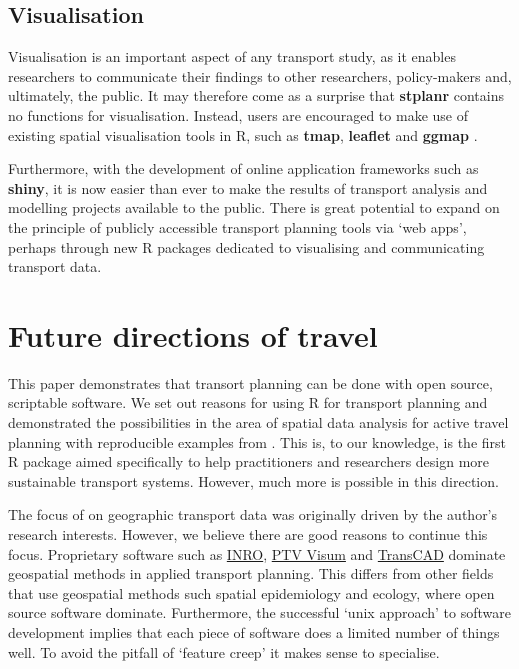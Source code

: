 \subsection{Visualisation}\label{visualisation}

Visualisation is an important aspect of any transport study, as it
enables researchers to communicate their findings to other researchers,
policy-makers and, ultimately, the public. It may therefore come as a
surprise that \textbf{stplanr} contains no functions for visualisation.
Instead, users are encouraged to make use of existing spatial
visualisation tools in R, such as \textbf{tmap}, \textbf{leaflet} and
\textbf{ggmap} \citep{cheshire_spatial_2015,kahle_ggmap:_2013}.

Furthermore, with the development of online application frameworks such
as \textbf{shiny}, it is now easier than ever to make the results of
transport analysis and modelling projects available to the public.
There is great potential to expand on
the principle of publicly accessible transport planning tools via `web
apps', perhaps through new R packages dedicated to visualising
and communicating transport data.

\section{Future directions of travel}\label{future-directions-of-travel}

This paper demonstrates that transort planning can be done with open source, scriptable software.
We set out reasons for using R for transport planning and demonstrated the possibilities in the area of spatial data analysis for active travel planning with reproducible examples from .
This is, to our knowledge, is the first R package aimed specifically to help practitioners and researchers design more sustainable transport systems.
However, much more is possible in this direction.

The focus of  on geographic transport data was originally driven by the author's research interests.
However, we believe there are good reasons to continue this focus.
Proprietary software such as \href{https://www.inrosoftware.com/en/products/emme/}{INRO}, \href{http://vision-traffic.ptvgroup.com/en-us/products/ptv-visum/}{PTV Visum} and  \href{http://www.caliper.com/tcovu.htm}{TransCAD} dominate geospatial methods in applied transport planning.
This differs from other fields that use geospatial methods such spatial epidemiology and ecology, where open source software dominate.
Furthermore, the successful `unix approach' to software development implies that each piece of software does a limited number of things well.
To avoid the pitfall of `feature creep' it makes sense to specialise.

